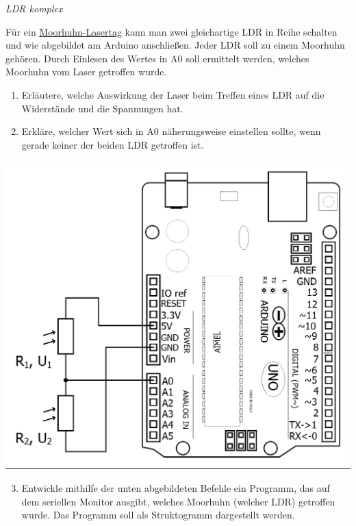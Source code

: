 \bigskip
\begin{aufgabe} \emph{LDR komplex}
	
	\medskip
	\begin{minipage}{0.5\textwidth}
		Für ein \href{https://www.el-voss.de/?p=159}{Moorhuhn-Lasertag} kann man zwei gleichartige LDR in Reihe schalten und wie abgebildet am Arduino anschließen. Jeder LDR soll zu einem Moorhuhn gehören. Durch Einlesen des Wertes in A0 soll ermittelt werden, welches Moorhuhn vom Laser getroffen wurde.
		
		\begin{enumerate}[label=\alph*), itemsep=0mm, parsep=0mm]
			\item Erläutere, welche Auswirkung der Laser beim Treffen eines LDR auf die Widerstände und die Spannungen hat.
			\item Erkläre, welcher Wert sich in A0 näherungsweise einstellen sollte, wenn gerade keiner der beiden LDR getroffen ist.
		\end{enumerate}
	\end{minipage}
	\hfill
	\begin{minipage}{0.48\textwidth}
		\centering
		\includegraphics[width=\textwidth]{./Zeichnungen/schaltplan-ldr-in-reihe.png}
	\end{minipage}

	\begin{enumerate}[label=\alph*), itemsep=0mm, parsep=0mm]
		\setcounter{enumi}{2}
		\item Entwickle mithilfe der unten abgebildeten Befehle ein Programm, das auf dem seriellen Monitor ausgibt, welches Moorhuhn (welcher LDR) getroffen wurde. Das Programm soll als Struktogramm dargestellt werden.
	\end{enumerate}
	

\end{aufgabe}
